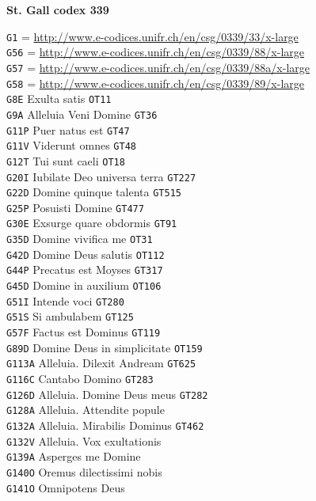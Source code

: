 \documentclass[a4paper]{article}
\begin{document}
{\begin{multicols}{2}
\noindent\textbf{St. Gall codex 339}

\noindent
\texttt{G1} = \url{http://www.e-codices.unifr.ch/en/csg/0339/33/x-large}\\
\texttt{G56} = \url{http://www.e-codices.unifr.ch/en/csg/0339/88/x-large}\\
\texttt{G57} = \url{http://www.e-codices.unifr.ch/en/csg/0339/88a/x-large}\\
\texttt{G58} = \url{http://www.e-codices.unifr.ch/en/csg/0339/89/x-large}\\
\texttt{G8E} Exulta satis \texttt{OT11}\\
\texttt{G9A} Alleluia Veni Domine \texttt{GT36}\\
\texttt{G11P} Puer natus est \texttt{GT47}\\
\texttt{G11V} Viderunt omnes \texttt{GT48}\\
\texttt{G12T} Tui sunt caeli \texttt{OT18}\\
\texttt{G20I} Iubilate Deo universa terra \texttt{GT227}\\
\texttt{G22D} Domine quinque talenta \texttt{GT515}\\
\texttt{G25P} Posuisti Domine \texttt{GT477}\\
\texttt{G30E} Exsurge quare obdormis \texttt{GT91}\\
\texttt{G35D} Domine vivifica me \texttt{OT31}\\
\texttt{G42D} Domine Deus salutis \texttt{OT112}\\
\texttt{G44P} Precatus est Moyses \texttt{GT317}\\
\texttt{G45D} Domine in auxilium \texttt{OT106}\\
\texttt{G51I} Intende voci \texttt{GT280}\\
\texttt{G51S} Si ambulabem \texttt{GT125}\\
\texttt{G57F} Factus est Dominus \texttt{GT119}\\
\texttt{G89D} Domine Deus in simplicitate \texttt{OT159}\\
\texttt{G113A} Alleluia. Dilexit Andream \texttt{GT625}\\
\texttt{G116C} Cantabo Domino \texttt{GT283}\\
\texttt{G126D} Alleluia. Domine Deus meus \texttt{GT282}\\
\texttt{G128A} Alleluia. Attendite popule\\
\texttt{G132A} Alleluia. Mirabilis Dominus \texttt{GT462}\\
\texttt{G132V} Alleluia. Vox exultationis\\
\texttt{G139A} Asperges me Domine\\
\texttt{G140O} Oremus dilectissimi nobis\\
\texttt{G141O} Omnipotens Deus


\end{multicols}}
\end{document}
